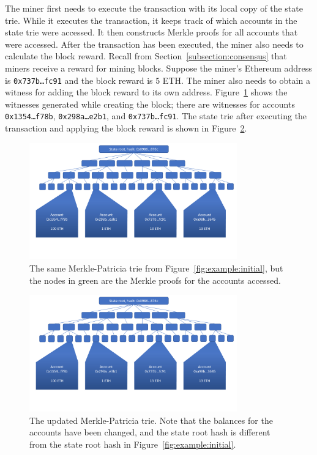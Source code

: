 \documentclass[12pt]{article}
\newcommand{\figurewidth}{0.8\textwidth}
\begin{document}
The miner first needs to execute the transaction with its local copy of the state trie. While it executes the transaction, it keeps track of which accounts in the state trie were accessed. It then constructs Merkle proofs for all accounts that were accessed. After the transaction has been executed, the miner also needs to calculate the block reward. Recall from Section~\ref{subsection:consensus} that miners receive a reward for mining blocks. Suppose the miner's Ethereum address is \texttt{0x737b\ldots fc91} and the block reward is $5$ ETH. The miner also needs to obtain a witness for adding the block reward to its own address. Figure~\ref{fig:example:proof} shows the witnesses generated while creating the block; there are witnesses for accounts \texttt{0x1354\ldots f78b}, \texttt{0x298a\ldots e2b1}, and \texttt{0x737b\ldots fc91}. The state trie after executing the transaction and applying the block reward is shown in Figure~\ref{fig:example:newstate}.

\begin{figure}[H]
  \centering
  \includegraphics[width=\figurewidth,page=3]{../figures/design/example.pdf}
  \caption{The same Merkle-Patricia trie from Figure~\ref{fig:example:initial}, but the nodes in green are the Merkle proofs for the accounts accessed.}
  \label{fig:example:proof}
\end{figure}

\begin{figure}[H]
  \centering
  \includegraphics[width=\figurewidth,page=4]{../figures/design/example.pdf}
  \caption{The updated Merkle-Patricia trie. Note that the balances for the accounts have been changed, and the state root hash is different from the state root hash in Figure~\ref{fig:example:initial}.}
  \label{fig:example:newstate}
\end{figure}
\end{document}
